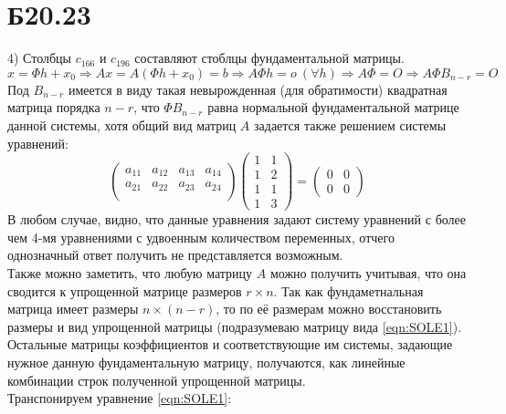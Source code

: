 \documentclass[a4paper,12pt]{article} %
\begin{document}
\section*{Б20.23}4)
Столбцы $c_{166}$ и $c_{196}$ составляют стоблцы фундаментальной матрицы.
$$x=\Phi h + x_0\Rightarrow Ax=A(\Phi h + x_0)=b\Rightarrow A\Phi h=o\ (\forall h)\Rightarrow A\Phi=O\Rightarrow A\Phi B_{n-r}=O$$
Под $B_{n-r}$ имеется в виду такая невырожденная (для обратимости) квадратная матрица порядка $n-r$, что $\Phi B_{n-r}$ равна нормальной фундаментальной матрице данной системы, хотя общий вид матриц $A$ задается также решением системы уравнений:
\begin{equation}
    \begin{pmatrix*}
a_{11}&a_{12}&a_{13}&a_{14}\\
a_{21}&a_{22}&a_{23}&a_{24}\\
\end{pmatrix*}\begin{pmatrix*}
1&1\\
1&2\\
1&1\\
1&3
\end{pmatrix*}=\begin{pmatrix*}
0&0\\
0&0
\end{pmatrix*}
\label{eqn:SOLE1}
\end{equation}
В любом случае, видно, что данные уравнения задают систему уравнений с более чем 4-мя уравнениями с удвоенным количеством переменных, отчего однозначный ответ получить не представляется возможным.\\
Также можно заметить, что любую матрицу $A$ можно получить учитывая, что она сводится к упрощенной матрице размеров $r\times n$. Так как фундаметнальная матрица имеет размеры $n\times(n-r)$, то по её размерам можно восстановить размеры и вид упрощенной матрицы (подразумеваю матрицу вида \eqref{eqn:SOLE1}). Остальные матрицы коэффициентов и соответствующие им системы, задающие нужное данную фундаментальную матрицу, получаются, как линейные комбинации строк полученной упрощенной матрицы.\\
Транспонируем уравнение \eqref{eqn:SOLE1}:
\end{document}
